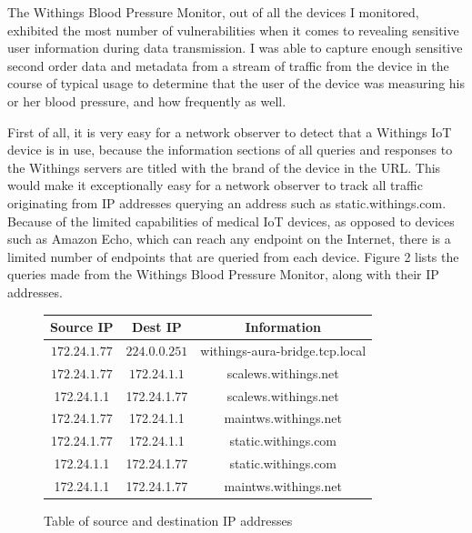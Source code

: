 The Withings Blood Pressure Monitor, out of all the devices I monitored, exhibited the most number of vulnerabilities when it comes to revealing sensitive user information during data transmission. I was able to capture enough sensitive second order data and metadata from a stream of traffic from the device in the course of typical usage to determine that the user of the device was measuring his or her blood pressure, and how frequently as well. 

First of all, it is very easy for a network observer to detect that a Withings IoT device is in use, because the information sections of all queries and responses to the Withings servers are titled with the brand of the device in the URL. This would make it exceptionally easy for a network observer to track all traffic originating from IP addresses querying an address such as static.withings.com. Because of the limited capabilities of medical IoT devices, as opposed to devices such as Amazon Echo, which can reach any endpoint on the Internet, there is a limited number of endpoints that are queried from each device. Figure 2 lists the queries made from the Withings Blood Pressure Monitor, along with their IP addresses. 

\begin{figure}
  \caption{Table of source and destination IP addresses}
  \begin{center}
    \begin{tabular}{||c c c||} 
    \hline
    Source IP & Dest IP & Information \\ [0.5ex] 
    \hline\hline
    $172.24.1.77$ & $224.0.0.251$ & withings-aura-bridge.tcp.local \\ 
    \hline
    $172.24.1.77$ &  $172.24.1.1$ & scalews.withings.net \\
    \hline
    172.24.1.1 &  172.24.1.77 & scalews.withings.net \\
    \hline
    172.24.1.77 &  172.24.1.1 & maintws.withings.net \\
    \hline
    172.24.1.77 &  172.24.1.1 & static.withings.com \\
    \hline
    172.24.1.1 &  172.24.1.77 & static.withings.com \\
    \hline
    172.24.1.1 &  172.24.1.77 & maintws.withings.net \\ [1ex] 
    \hline
    \end{tabular}
  \end{center}
\end{figure}


